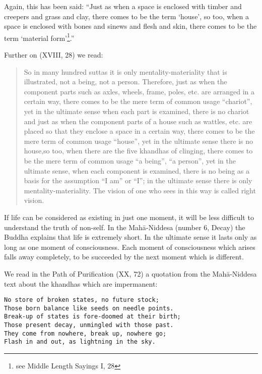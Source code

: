\documentclass{book}
\begin{document}
Again, this has been said: ``Just as when a space is enclosed with
timber and creepers and grass and clay, there comes to be the term
`house', so too, when a space is enclosed with bones and sinews and
flesh and skin, there comes to be the term `material form'\footnote{ see
  Middle Length Sayings I, 28}.''

Further on (XVIII, 28) we read:

\begin{quote}
So in many hundred suttas it is only mentality-materiality that is
illustrated, not a being, not a person. Therefore, just as when the
component parts such as axles, wheels, frame, poles, etc. are arranged
in a certain way, there comes to be the mere term of common usage
``chariot'', yet in the ultimate sense when each part is examined, there
is no chariot and just as when the component parts of a house such as
wattles, etc. are placed so that they enclose a space in a certain way,
there comes to be the mere term of common usage ``house'', yet in the
ultimate sense there is no house,so too, when there are the five
khandhas of clinging, there comes to be the mere term of common usage
``a being'', ``a person'', yet in the ultimate sense, when each
component is examined, there is no being as a basis for the assumption
``I am'' or ``I''; in the ultimate sense there is only
mentality-materiality. The vision of one who sees in this way is called
right vision.
\end{quote}

If life can be considered as existing in just one moment, it will be
less difficult to understand the truth of non-self. In the Mahā-Niddesa
(number 6, Decay) the Buddha ex­plains that life is extremely short. In
the ultimate sense it lasts only as long as one moment of consciousness.
Each moment of consciousness which arises falls away com­pletely, to be
succeeded by the next moment which is different.

We read in the Path of Purification (XX, 72) a quotation from the
Mahā-Niddesa text about the khandhas which are impermanent:

\begin{verbatim}
No store of broken states, no future stock;
Those born balance like seeds on needle points.
Break-up of states is fore-doomed at their birth;
Those present decay, unmingled with those past.
They come from nowhere, break up, nowhere go;
Flash in and out, as lightning in the sky.
\end{verbatim}
\end{document}
